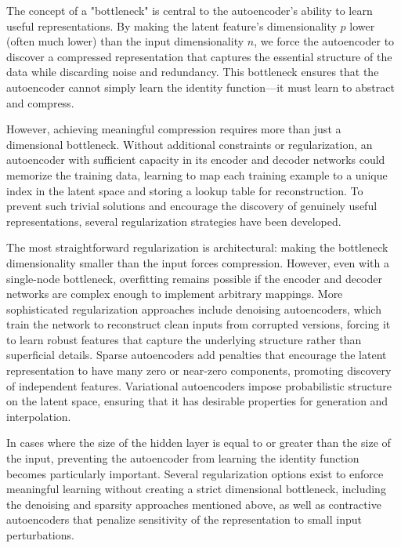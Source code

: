 The concept of a "bottleneck" is central to the autoencoder's ability to learn useful representations. By making the latent feature's dimensionality $p$ lower (often much lower) than the input dimensionality $n$, we force the autoencoder to discover a compressed representation that captures the essential structure of the data while discarding noise and redundancy. This bottleneck ensures that the autoencoder cannot simply learn the identity function—it must learn to abstract and compress.

However, achieving meaningful compression requires more than just a dimensional bottleneck. Without additional constraints or regularization, an autoencoder with sufficient capacity in its encoder and decoder networks could memorize the training data, learning to map each training example to a unique index in the latent space and storing a lookup table for reconstruction. To prevent such trivial solutions and encourage the discovery of genuinely useful representations, several regularization strategies have been developed.

The most straightforward regularization is architectural: making the bottleneck dimensionality smaller than the input forces compression. However, even with a single-node bottleneck, overfitting remains possible if the encoder and decoder networks are complex enough to implement arbitrary mappings. More sophisticated regularization approaches include denoising autoencoders, which train the network to reconstruct clean inputs from corrupted versions, forcing it to learn robust features that capture the underlying structure rather than superficial details. Sparse autoencoders add penalties that encourage the latent representation to have many zero or near-zero components, promoting discovery of independent features. Variational autoencoders impose probabilistic structure on the latent space, ensuring that it has desirable properties for generation and interpolation.

In cases where the size of the hidden layer is equal to or greater than the size of the input, preventing the autoencoder from learning the identity function becomes particularly important. Several regularization options exist to enforce meaningful learning without creating a strict dimensional bottleneck, including the denoising and sparsity approaches mentioned above, as well as contractive autoencoders that penalize sensitivity of the representation to small input perturbations.

